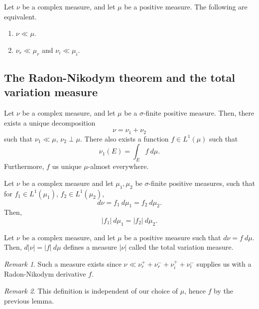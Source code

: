 \documentclass[11pt]{article}
\theoremstyle{definition}
\theoremstyle{remark}
\newtheorem*{remark}{Remark}
\begin{document}
    \begin{lemma}
        Let $\nu$ be a complex measure, and let $\mu$ be a positive measure. The
        following are equivalent.
        \begin{enumerate}
            \item $\nu \ll \mu$.
            \item $\nu_r \ll \mu_r$ and $\nu_i \ll \mu_i$.
        \end{enumerate}
    \end{lemma}

    \subsection{The Radon-Nikodym theorem and the total variation measure}

    \begin{theorem}
        Let $\nu$ be a complex measure, and let $\mu$ be a $\sigma$-finite positive
        measure. Then, there exists a unique decomposition \[
            \nu = \nu_1 + \nu_2
        \] such that $\nu_1 \ll \mu$, $\nu_2 \perp \mu$. There also exists a function
        $f \in L^1(\mu)$ such that \[
            \nu_1(E) = \int_E f \:d\mu.
        \] Furthermore, $f$ us unique $\mu$-almost everywhere.
    \end{theorem}

    \begin{lemma}
        Let $\nu$ be a complex measure and let $\mu_1, \mu_2$ be $\sigma$-finite
        positive measures, such that for $f_1 \in L^1(\mu_1)$, $f_2 \in L^1(\mu_2)$, \[
            d\nu = f_1\:d\mu_1 = f_2\:d\mu_2.
        \] Then, \[
            |f_1|\:d\mu_1 = |f_2|\:d\mu_2.
        \]
    \end{lemma}

    \begin{definition}
        Let $\nu$ be a complex measure, and let $\mu$ be a positive measure such that
        $d\nu = f\:d\mu$. Then, $d|\nu| = |f|\:d\mu$ defines a measure $|\nu|$ called
        the total variation measure.

        \begin{remark}
            Such a measure exists since $\nu \ll \nu_r^+ + \nu_r^- + \nu_i^+ +
            \nu_i^-$ supplies us with a Radon-Nikodym derivative $f$.
        \end{remark}
        \begin{remark}
            This definition is independent of our choice of $\mu$, hence $f$ by the
            previous lemma.
        \end{remark}
    \end{definition}
\end{document}
